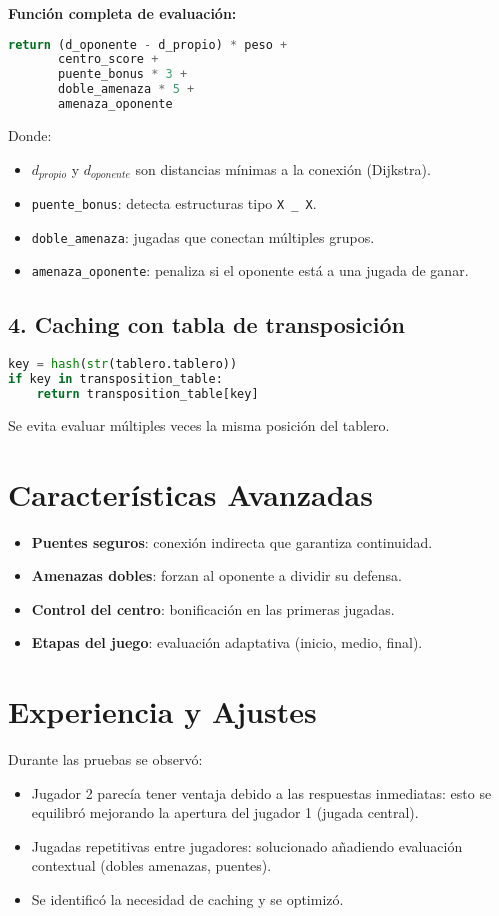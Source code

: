 \documentclass[12pt]{article}
\begin{document}
\textbf{Función completa de evaluación:}
\begin{lstlisting}[language=Python]
return (d_oponente - d_propio) * peso + 
       centro_score +
       puente_bonus * 3 +
       doble_amenaza * 5 +
       amenaza_oponente
\end{lstlisting}

Donde:
\begin{itemize}
  \item $d_{propio}$ y $d_{oponente}$ son distancias mínimas a la conexión (Dijkstra).
  \item \texttt{puente\_bonus}: detecta estructuras tipo \texttt{X \_ X}.
  \item \texttt{doble\_amenaza}: jugadas que conectan múltiples grupos.
  \item \texttt{amenaza\_oponente}: penaliza si el oponente está a una jugada de ganar.
\end{itemize}

\subsection{4. Caching con tabla de transposición}

\begin{lstlisting}[language=Python]
key = hash(str(tablero.tablero))
if key in transposition_table:
    return transposition_table[key]
\end{lstlisting}

Se evita evaluar múltiples veces la misma posición del tablero.

\section{Características Avanzadas}
\begin{itemize}
  \item \textbf{Puentes seguros}: conexión indirecta que garantiza continuidad.
  \item \textbf{Amenazas dobles}: forzan al oponente a dividir su defensa.
  \item \textbf{Control del centro}: bonificación en las primeras jugadas.
  \item \textbf{Etapas del juego}: evaluación adaptativa (inicio, medio, final).
\end{itemize}

\section{Experiencia y Ajustes}
Durante las pruebas se observó:

\begin{itemize}
  \item Jugador 2 parecía tener ventaja debido a las respuestas inmediatas: esto se equilibró mejorando la apertura del jugador 1 (jugada central).
  \item Jugadas repetitivas entre jugadores: solucionado añadiendo evaluación contextual (dobles amenazas, puentes).
  \item Se identificó la necesidad de caching y se optimizó.
\end{itemize}
\end{document}

